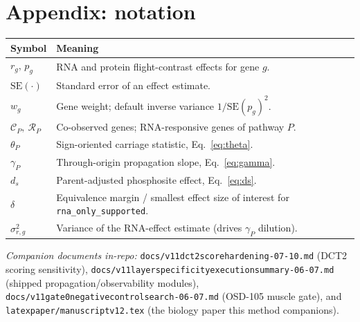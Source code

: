 \documentclass[11pt]{article}
\newcommand{\Crna}{\texttt{rna\_only\_supported}}
\newcommand{\breakuscore}{\textunderscore\allowbreak}
\newcommand{\code}[1]{\texttt{\small\let\_\breakuscore #1}}
\begin{document}
\section*{Appendix: notation}
\begin{center}\small
\begin{tabularx}{\textwidth}{@{}p{2.6cm} L@{}}
\toprule
Symbol & Meaning \\
\midrule
$r_g,\,p_g$ & RNA and protein flight-contrast effects for gene $g$. \\
$\mathrm{SE}(\cdot)$ & Standard error of an effect estimate. \\
$w_g$ & Gene weight; default inverse variance $1/\mathrm{SE}(p_g)^2$. \\
$\mathcal{C}_P,\ \mathcal{R}_P$ & Co-observed genes; RNA-responsive genes of pathway $P$. \\
$\theta_P$ & Sign-oriented carriage statistic, Eq.~\eqref{eq:theta}. \\
$\gamma_P$ & Through-origin propagation slope, Eq.~\eqref{eq:gamma}. \\
$d_s$ & Parent-adjusted phosphosite effect, Eq.~\eqref{eq:ds}. \\
$\delta$ & Equivalence margin / smallest effect size of interest for \Crna{}. \\
$\sigma_{r,g}^2$ & Variance of the RNA-effect estimate (drives $\gamma_P$ dilution). \\
\bottomrule
\end{tabularx}
\end{center}

\vfill
\noindent\footnotesize\textit{Companion documents in-repo:}
\code{docs/v11\_dct2\_score\_hardening\_2026-07-10.md} (DCT2 scoring sensitivity),
\code{docs/v11\_layer\_specificity\_execution\_summary\_2026-06-07.md} (shipped propagation/observability
modules), \code{docs/v11\_gate0\_negative\_control\_search\_2026-06-07.md} (OSD-105 muscle gate), and
\code{latex\_paper/manuscript\_v12.tex} (the biology paper this method companions).
\end{document}
